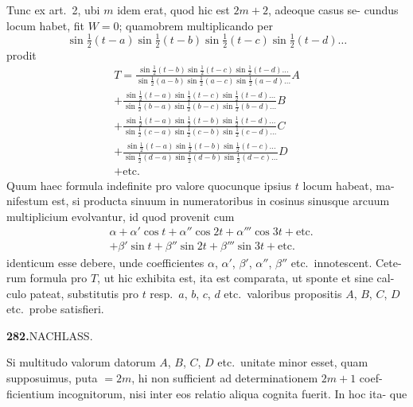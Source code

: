 \documentclass[12pt,a4paper]{article}
\begin{document}
\smallskip\noindent
Tunc ex art.\ 2, ubi $m$ idem erat, quod hic est $2m+2$, adeoque casus se-
cundus locum habet, fit $W=0$; quamobrem multiplicando per
\begin{equation*}
\sin\tfrac{1}{2}(t-a)\sin\tfrac{1}{2}(t-b)\sin\tfrac{1}{2}(t-c)\sin\tfrac{1}{2}(t-d)\dots
\end{equation*}
prodit
\begin{multline*}
T =
\frac{\sin\tfrac{1}{2}(t-b)\sin\tfrac{1}{2}(t-c)\sin\tfrac{1}{2}(t-d)\dots}
     {\sin\tfrac{1}{2}(a-b)\sin\tfrac{1}{2}(a-c)\sin\tfrac{1}{2}(a-d)\dots}A\\
+ \frac{\sin\tfrac{1}{2}(t-a)\sin\tfrac{1}{2}(t-c)\sin\tfrac{1}{2}(t-d)\dots}
       {\sin\tfrac{1}{2}(b-a)\sin\tfrac{1}{2}(b-c)\sin\tfrac{1}{2}(b-d)\dots}B\\
+ \frac{\sin\tfrac{1}{2}(t-a)\sin\tfrac{1}{2}(t-b)\sin\tfrac{1}{2}(t-d)\dots}
       {\sin\tfrac{1}{2}(c-a)\sin\tfrac{1}{2}(c-b)\sin\tfrac{1}{2}(c-d)\dots}C\\
+ \frac{\sin\tfrac{1}{2}(t-a)\sin\tfrac{1}{2}(t-b)\sin\tfrac{1}{2}(t-c)\dots}
       {\sin\tfrac{1}{2}(d-a)\sin\tfrac{1}{2}(d-b)\sin\tfrac{1}{2}(d-c)\dots}D\\
+ \text{etc.}
\end{multline*}
Quum haec formula indefinite pro valore quocunque ipsius $t$ locum habeat, ma-
nifestum est, si producta sinuum in numeratoribus in cosinus sinusque arcuum
multiplicium evolvantur, id quod provenit cum
\begin{align*}
&\alpha + \alpha'\cos t + \alpha''\cos 2t + \alpha'''\cos 3t + \text{etc.}\\
&+ \beta'\sin t + \beta''\sin 2t + \beta'''\sin 3t + \text{etc.}
\end{align*}
identicum esse debere, unde coefficientes $\alpha$, $\alpha'$, $\beta'$, $\alpha''$, $\beta''$ etc.\ innotescent. Cete-
rum formula pro $T$, ut hic exhibita est, ita est comparata, ut sponte et sine cal-
culo pateat, substitutis pro $t$ resp.\ $a$, $b$, $c$, $d$ etc.\ valoribus propositis $A$, $B$, $C$, $D$
etc.\ probe satisfieri.

\newpage
\noindent\textbf{282.}\quad NACHLASS.

\smallskip\noindent
Si multitudo valorum datorum $A$, $B$, $C$, $D$ etc.\ unitate minor esset, quam
supposuimus, puta $=2m$, hi non sufficient ad determinationem $2m+1$ coef-
ficientium incognitorum, nisi inter eos relatio aliqua cognita fuerit. In hoc ita-
que
\end{document}
